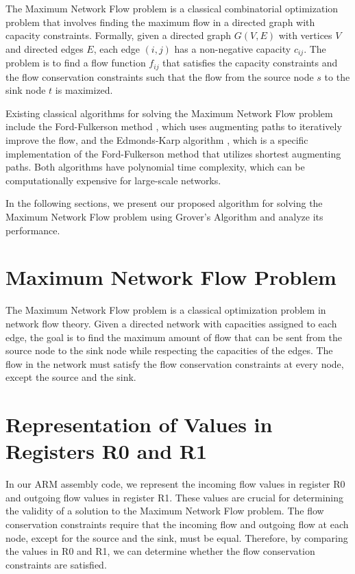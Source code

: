The Maximum Network Flow problem is a classical combinatorial optimization problem that involves finding the maximum flow in a directed graph with capacity constraints. Formally, given a directed graph $G(V, E)$ with vertices $V$ and directed edges $E$, each edge $(i, j)$ has a non-negative capacity $c_{ij}$. The problem is to find a flow function $f_{ij}$ that satisfies the capacity constraints and the flow conservation constraints such that the flow from the source node $s$ to the sink node $t$ is maximized.

Existing classical algorithms for solving the Maximum Network Flow problem include the Ford-Fulkerson method \cite{ford1956maximal}, which uses augmenting paths to iteratively improve the flow, and the Edmonds-Karp algorithm \cite{edmonds1972theoretical}, which is a specific implementation of the Ford-Fulkerson method that utilizes shortest augmenting paths. Both algorithms have polynomial time complexity, which can be computationally expensive for large-scale networks.

In the following sections, we present our proposed algorithm for solving the Maximum Network Flow problem using Grover's Algorithm and analyze its performance.


\section{Maximum Network Flow Problem}

The Maximum Network Flow problem is a classical optimization problem in network flow theory. Given a directed network with capacities assigned to each edge, the goal is to find the maximum amount of flow that can be sent from the source node to the sink node while respecting the capacities of the edges. The flow in the network must satisfy the flow conservation constraints at every node, except the source and the sink.

\section{Representation of Values in Registers R0 and R1}

In our ARM assembly code, we represent the incoming flow values in register R0 and outgoing flow values in register R1. These values are crucial for determining the validity of a solution to the Maximum Network Flow problem. The flow conservation constraints require that the incoming flow and outgoing flow at each node, except for the source and the sink, must be equal. Therefore, by comparing the values in R0 and R1, we can determine whether the flow conservation constraints are satisfied.

